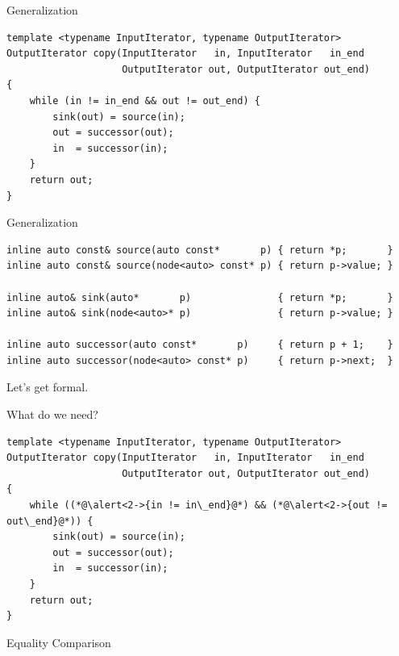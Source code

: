 \documentclass[aspectratio=169]{beamer}
\begin{document}

\begin{frame}[fragile]{Generalization}
  \small
\begin{lstlisting}
template <typename InputIterator, typename OutputIterator>
OutputIterator copy(InputIterator   in, InputIterator   in_end
                    OutputIterator out, OutputIterator out_end)
{
    while (in != in_end && out != out_end) {
        sink(out) = source(in);
        out = successor(out);
        in  = successor(in);
    }
    return out;
}
\end{lstlisting}
\end{frame}


\begin{frame}[fragile]{Generalization}
  \small
\begin{lstlisting}
inline auto const& source(auto const*       p) { return *p;       }
inline auto const& source(node<auto> const* p) { return p->value; }

inline auto& sink(auto*       p)               { return *p;       }
inline auto& sink(node<auto>* p)               { return p->value; }

inline auto successor(auto const*       p)     { return p + 1;    }
inline auto successor(node<auto> const* p)     { return p->next;  }
\end{lstlisting}
\end{frame}


\begin{frame}[standout]
  Let's get formal.
\end{frame}


\begin{frame}[fragile]{What do we need?}
  \footnotesize
\begin{lstlisting}
template <typename InputIterator, typename OutputIterator>
OutputIterator copy(InputIterator   in, InputIterator   in_end
                    OutputIterator out, OutputIterator out_end)
{
    while ((*@\alert<2->{in != in\_end}@*) && (*@\alert<2->{out != out\_end}@*)) {
        sink(out) = source(in);
        out = successor(out);
        in  = successor(in);
    }
    return out;
}
\end{lstlisting}
  \pause{}
  \begin{center}
    \Large Equality Comparison
  \end{center}
\end{frame}
\end{document}
